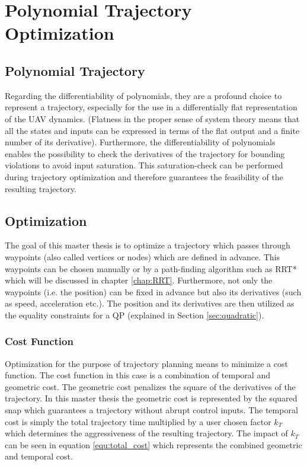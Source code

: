 \chapter{Polynomial Trajectory Optimization}\label{sec:trajectory}


\section{Polynomial Trajectory}\label{sec:polynomial}

Regarding the differentiability of polynomials, they are a profound choice to represent a trajectory, especially for the use in a differentially flat representation of the UAV dynamics. (Flatness in the proper sense of system theory means that all the states and inputs can be expressed in terms of the flat output and a finite number of its derivative).
Furthermore, the differentiability of polynomials enables the possibility to check the derivatives of the trajectory for bounding violations to avoid input saturation. This saturation-check can be performed during trajectory optimization and therefore guarantees the feasibility of the resulting trajectory.

\section{Optimization}\label{sec:optimization}

The goal of this master thesis is to optimize a trajectory which passes through waypoints (also called vertices or nodes) which are defined in advance. This waypoints can be chosen manually or by a path-finding algorithm such as RRT* which will be discussed in chapter \ref{chap:RRT}.
Furthermore, not only the waypoints (i.e. the position) can be fixed in advance but also its derivatives (such as speed, acceleration etc.). The position and its derivatives are then utilized as the equality constraints for a QP (explained in Section \ref{sec:quadratic}).

\subsection{Cost Function}\label{sec:cost}

Optimization for the purpose of trajectory planning means to minimize a cost function. The cost function in this case is a combination of temporal and geometric cost. The geometric cost penalizes the square of the derivatives of the trajectory. In this master thesis the geometric cost is represented by the squared snap which guarantees a trajectory without abrupt  control inputs. \newline
The temporal cost is simply the total trajectory time multiplied by a user chosen factor $k_T$ which determines the aggressiveness of the resulting trajectory. The impact of  $k_T$  can be seen in equation \ref{equ:total_cost} which represents the combined geometric and temporal cost. \newline

